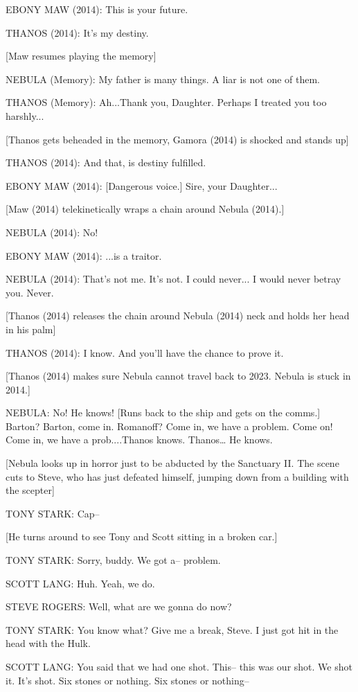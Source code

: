 EBONY MAW (2014): This is your future.

THANOS (2014): It's my destiny.

[Maw resumes playing the memory]

NEBULA (Memory): My father is many things. A liar is not one of them.

THANOS (Memory): Ah...Thank you, Daughter. Perhaps I treated you too harshly...

[Thanos gets beheaded in the memory, Gamora (2014) is shocked and stands up]

THANOS (2014): And that, is destiny fulfilled.

EBONY MAW (2014): [Dangerous voice.] Sire, your Daughter...

[Maw (2014) telekinetically wraps a chain around Nebula (2014).]

NEBULA (2014): No!

EBONY MAW (2014): ...is a traitor.

NEBULA (2014): That's not me. It's not. I could never... I would never betray you. Never.

[Thanos (2014) releases the chain around Nebula (2014) neck and holds her head in his palm]

THANOS (2014): I know. And you'll have the chance to prove it.

[Thanos (2014) makes sure Nebula cannot travel back to 2023. Nebula is stuck in 2014.]

NEBULA: No! He knows! [Runs back to the ship and gets on the comms.] Barton? Barton, come in. Romanoff? Come in, we have a problem. Come on! Come in, we have a prob....Thanos knows. Thanos… He knows.

[Nebula looks up in horror just to be abducted by the Sanctuary II. The scene cuts to Steve, who has just defeated himself, jumping down from a building with the scepter]

TONY STARK: Cap–

[He turns around to see Tony and Scott sitting in a broken car.]

TONY STARK: Sorry, buddy. We got a– problem.

SCOTT LANG: Huh. Yeah, we do.

STEVE ROGERS: Well, what are we gonna do now?

TONY STARK: You know what? Give me a break, Steve. I just got hit in the head with the Hulk.

SCOTT LANG: You said that we had one shot. This– this was our shot. We shot it. It's shot. Six stones or nothing. Six stones or nothing–

